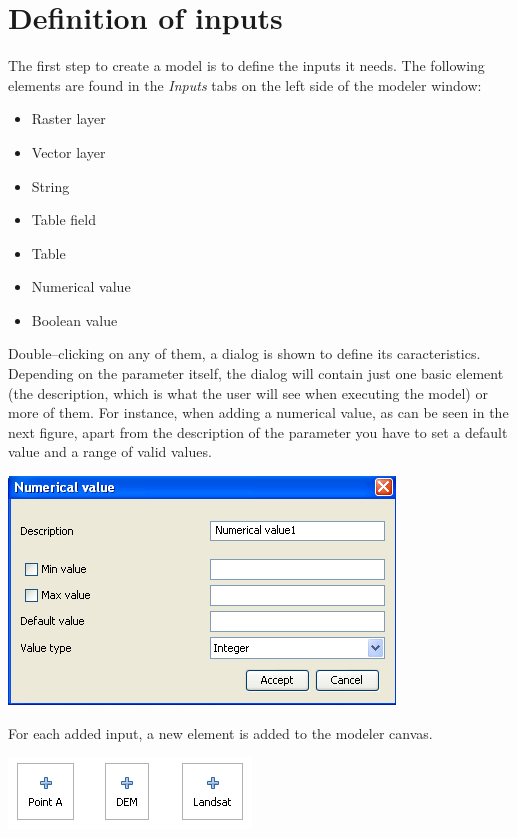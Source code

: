 \section{Definition of inputs}

The first step to create a model is to define the inputs it needs. The following elements are found in the \emph{Inputs} tabs on the left side of the modeler window:

\begin{itemize}
	\item Raster layer
	\item Vector layer 
	\item String
	\item Table field
	\item Table
	\item Numerical value 
	\item Boolean value 
\end{itemize}

Double--clicking on any of them, a dialog is shown to define its caracteristics. Depending on the parameter itself, the dialog will contain just one basic element (the description, which is what the user will see when executing the model) or more of them. For instance, when adding a numerical value, as can be seen in the next figure, apart from the description of the parameter you have to set a default value and a range of valid values.

\begin{center}
\includegraphics[width=.4\columnwidth]{models_parameters.png}
\end{center}

For each added input, a new element is added to the modeler canvas.

\begin{center}
\includegraphics[width=.4\columnwidth]{models_parameters2.png}
\end{center}

